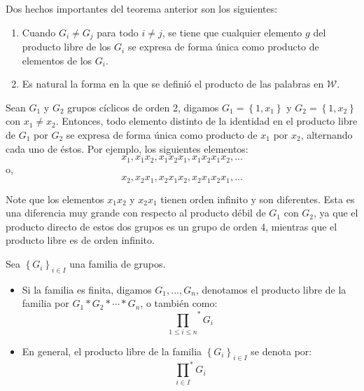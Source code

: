 \documentclass[12pt]{report}
\newcounter{it}
\theoremstyle{largebreak}
\begin{document}
    \begin{obs}
        Dos hechos importantes del teorema anterior son los siguientes:
        \begin{enumerate}[label = \textit{(\alph*)}]
            \item Cuando $G_i\neq G_j$ para todo $i\neq j$, se tiene que cualquier elemento $g$ del producto libre de los $G_i$ se expresa de forma única como producto de elementos de los $G_i$.
            \item Es natural la forma en la que se definió el producto de las palabras en $\mathscr{W}$.
        \end{enumerate}
    \end{obs}

    \begin{exa}
        Sean $G_1$ y $G_2$ grupos cíclicos de orden 2, digamos $G_1=\left\{1,x_1 \right\}$ y $G_2=\left\{1,x_2 \right\}$ con $x_1\neq x_2$. Entonces, todo elemento distinto de la identidad en el producto libre de $G_1$ por $G_2$ se expresa de forma única como producto de $x_1$ por $x_2$, alternando cada uno de éstos. Por ejemplo, los siguientes elementos:
        \begin{equation*}
            x_1,x_1x_2,x_1x_2x_1,x_1x_2x_1x_2,...
        \end{equation*}
        o,
        \begin{equation*}
            x_2,x_2 x_1,x_2x_1x_2,x_2x_1x_2x_1,...
        \end{equation*}

        Note que los elementos $x_1x_2$ y $x_2x_1$ tienen orden infinito y son diferentes. Esta es una diferencia muy grande con respecto al producto débil de $G_1$ con $G_2$, ya que el producto directo de estos dos grupos es un grupo de orden 4, mientras que el producto libre es de orden infinito.
    \end{exa}

    \begin{mydef}
        Sea $\left\{G_i \right\}_{ i\in I}$ una familia de grupos.
        \begin{itemize}
            \item Si la familia es finita, digamos $G_1,...,G_n$, denotamos el producto libre de la familia por $G_1*G_2*\cdots*G_n$, o también como:
            \begin{equation*}
                {\prod_{ 1\leq i\leq n}}^*G_i
            \end{equation*}
            \item En general, el producto libre de la familia $\left\{G_i \right\}_{ i\in I}$ se denota por:
            \begin{equation*}
                {\prod_{ i\in I}}^*G_i
            \end{equation*}
        \end{itemize}
    \end{mydef}
    
\end{document}
